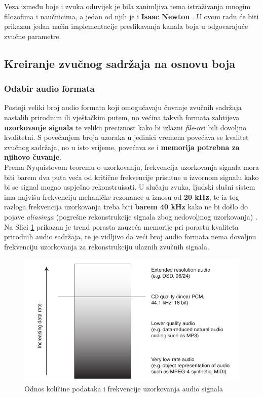 \documentclass[12pt,a4paper]{article}
\begin{document}
Veza između boje i zvuka oduvijek je bila zanimljiva tema istraživanja mnogim filozofima i naučnicima, a jedan od njih je i \textbf{Isaac Newton} \cite{n3}. U ovom radu će biti prikazan jedan način implementacije preslikavanja kanala boja u odgovarajuće zvučne parametre.

\subsection{Kreiranje zvučnog sadržaja na osnovu boja}

\subsubsection{Odabir audio formata}

Postoji veliki broj audio formata koji omogućavaju čuvanje zvučnih sadržaja nastalih prirodnim ili vještačkim putem, no većina takvih formata zahtijeva \textbf{uzorkovanje signala} te veliku preciznost kako bi izlazni \textit{file}-ovi bili dovoljno kvalitetni. S povećanjem broja uzoraka u jedinici vremena povećava se kvalitet zvučnog sadržaja, no u isto vrijeme, povećava se i \textbf{memorija potrebna za njihovo čuvanje}. \\

Prema Nyquistovom teoremu o uzorkovanju, frekvencija uzorkovanja signala mora biti barem dva puta veća od kritične frekvencije prisutne u izvornom signalu kako bi se signal mogao uspješno rekonstruisati. U slučaju zvuka, ljudski slušni sistem ima najvišu frekvenciju mehaničke rezonance u iznosu od \textbf{20 kHz}, te iz tog razloga frekvencija uzorkovanja treba biti \textbf{barem 40 kHz} kako ne bi došlo do pojave \textit{aliasinga} (pogrešne rekonstrukcije signala zbog nedovoljnog uzorkovanja) \cite{shupi}. Na Slici \ref{audioQualities} prikazan je trend porasta zauzeća memorije pri porastu kvaliteta prirodnih audio sadržaja, te je vidljivo da veći broj audio formata nema dovoljnu frekvenciju uzorkovanja za rekonstrukciju ulaznih zvučnih signala. \cite{dat}\\

\begin{figure}[H]

\center
\includegraphics[scale=0.35]{../res/audioQualities.png}
\caption{Odnos količine podataka i frekvencije uzorkovanja audio signala \cite{dat}}
\label{audioQualities}

\end{figure}
\end{document}
